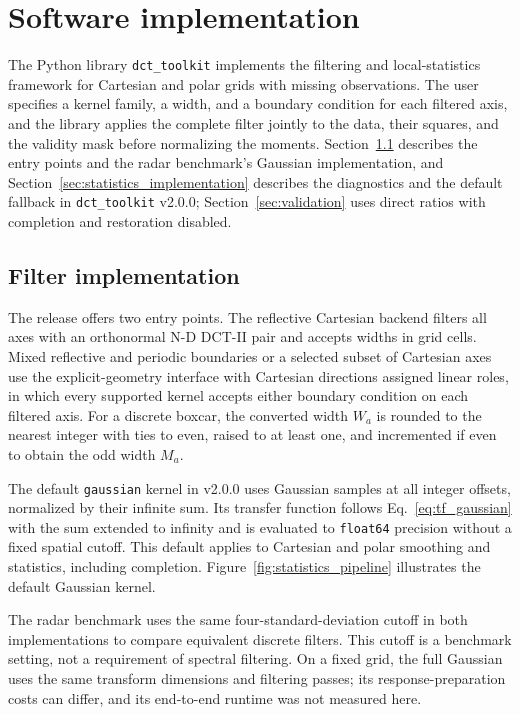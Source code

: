 \documentclass[a4paper,fleqn]{cas-sc}
\begin{document}
\section{Software implementation}
\label{sec:software_implementation}

The Python library \texttt{dct\_toolkit} implements the filtering and local-statistics framework for Cartesian and polar grids with missing observations. The user specifies a kernel family, a width, and a boundary condition for each filtered axis, and the library applies the complete filter jointly to the data, their squares, and the validity mask before normalizing the moments. Section~\ref{sec:filter_implementation} describes the entry points and the radar benchmark's Gaussian implementation, and Section~\ref{sec:statistics_implementation} describes the diagnostics and the default fallback in \texttt{dct\_toolkit} v2.0.0; Section~\ref{sec:validation} uses direct ratios with completion and restoration disabled.

\subsection{Filter implementation}
\label{sec:filter_implementation}

The release offers two entry points. The reflective Cartesian backend filters all axes with an orthonormal N-D DCT-II pair and accepts widths in grid cells. Mixed reflective and periodic boundaries or a selected subset of Cartesian axes use the explicit-geometry interface with Cartesian directions assigned linear roles, in which every supported kernel accepts either boundary condition on each filtered axis. For a discrete boxcar, the converted width $W_a$ is rounded to the nearest integer with ties to even, raised to at least one, and incremented if even to obtain the odd width $M_a$.

The default \texttt{gaussian} kernel in v2.0.0 uses Gaussian samples at all integer offsets, normalized by their infinite sum. Its transfer function follows Eq.~\ref{eq:tf_gaussian} with the sum extended to infinity and is evaluated to \texttt{float64} precision without a fixed spatial cutoff. This default applies to Cartesian and polar smoothing and statistics, including completion. Figure~\ref{fig:statistics_pipeline} illustrates the default Gaussian kernel.

The radar benchmark uses the same four-standard-deviation cutoff in both implementations to compare equivalent discrete filters. This cutoff is a benchmark setting, not a requirement of spectral filtering. On a fixed grid, the full Gaussian uses the same transform dimensions and filtering passes; its response-preparation costs can differ, and its end-to-end runtime was not measured here.
\end{document}
